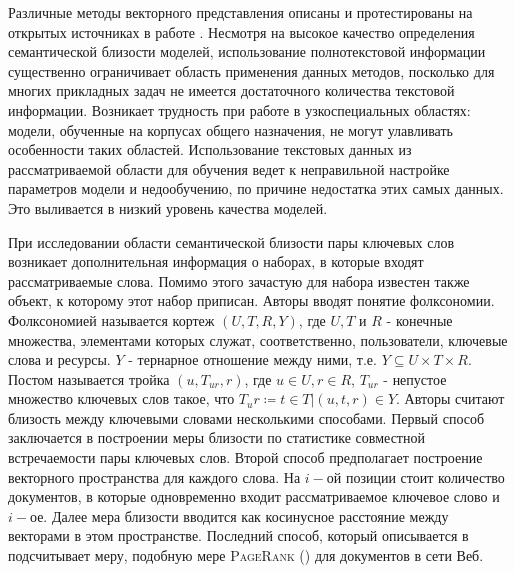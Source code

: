Различные методы векторного представления описаны и протестированы на открытых источниках в работе \cite{embed_1}. Несмотря на высокое качество определения семантической близости моделей, использование полнотекстовой информации существенно ограничивает область применения данных методов, посколько для многих прикладных задач не имеется достаточного количества текстовой информации. Возникает трудность при работе в узкоспециальных областях: модели, обученные на корпусах общего назначения, не могут улавливать особенности таких областей. Использование текстовых данных из рассматриваемой области для обучения ведет к неправильной настройке параметров модели и недообучению, по причине недостатка этих самых данных. Это выливается в низкий уровень качества моделей. 

При исследовании области семантической близости пары ключевых слов возникает дополнительная информация о наборах, в которые входят рассматриваемые слова. Помимо этого зачастую для набора известен также объект, к которому этот набор приписан. Авторы \cite{folk} вводят понятие фолксономии. Фолксономией называется кортеж $(U, T, R, Y)$, где $U,T$ и $R$ - конечные множества, элементами которых служат, соответственно, пользователи, ключевые слова и ресурсы. $Y$ - тернарное отношение между ними, т.е. $Y  \subseteq U \times T \times R$. Постом называется тройка $(u, T_{ur}, r)$, где $u \in U, r \in R$, $T_{ur}$ - непустое множество ключевых слов такое, что $T_ur  \coloneqq {t \in T | (u, t, r) \in Y}$. Авторы \cite{folk_2} считают близость между ключевыми словами несколькими способами. Первый способ заключается в построении меры близости по статистике совместной встречаемости пары ключевых слов. Второй способ предполагает построение векторного пространства для каждого слова. На $i-$ой позиции стоит количество документов, в которые одновременно входит рассматриваемое ключевое слово и $i-$ое. Далее мера близости вводится как косинусное расстояние между векторами в этом пространстве. Последний способ, который описывается в \cite{folk} подсчитывает меру, подобную мере \textsc{PageRank} (\cite{pagerank}) для документов в сети Веб.

